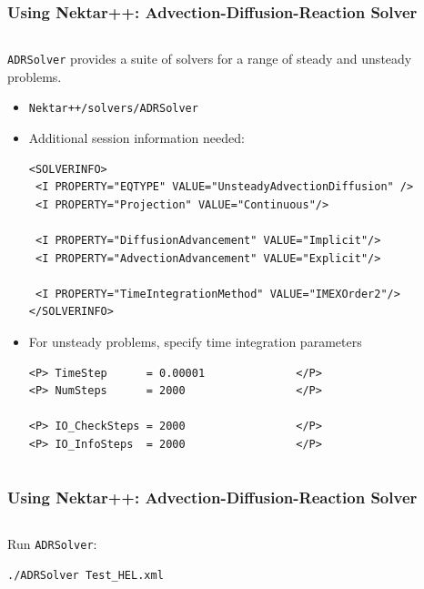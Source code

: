 \documentclass{beamer}
\numberwithin{figure}{section}
\numberwithin{equation}{section}
\begin{document}

\begin{frame}[fragile]
\frametitle{Using Nektar++: Advection-Diffusion-Reaction Solver}
\begin{minipage}[c][0.8\textheight][t]{\linewidth}
\begin{columns}
\begin{column}[l]{11.5cm}
\texttt{ADRSolver} provides a suite of solvers for a range of steady and
unsteady problems.
\begin{itemize}
  \item \texttt{Nektar++/solvers/ADRSolver}
  \item Additional session information needed:
  \begin{lstlisting}
<SOLVERINFO>
 <I PROPERTY="EQTYPE" VALUE="UnsteadyAdvectionDiffusion" />
 <I PROPERTY="Projection" VALUE="Continuous"/>
 
 <I PROPERTY="DiffusionAdvancement" VALUE="Implicit"/>
 <I PROPERTY="AdvectionAdvancement" VALUE="Explicit"/>
 
 <I PROPERTY="TimeIntegrationMethod" VALUE="IMEXOrder2"/>
</SOLVERINFO>
  \end{lstlisting}
  \item For unsteady problems, specify time integration parameters
  \begin{lstlisting}
<P> TimeStep      = 0.00001              </P>
<P> NumSteps      = 2000                 </P>

<P> IO_CheckSteps = 2000                 </P>
<P> IO_InfoSteps  = 2000                 </P>
  \end{lstlisting}
\end{itemize}
\end{column}
\end{columns}
\end{minipage}
\end{frame}


\begin{frame}[fragile]
\frametitle{Using Nektar++: Advection-Diffusion-Reaction Solver}
\begin{minipage}[c][0.8\textheight][t]{\linewidth}
\begin{columns}
\begin{column}[l]{11.5cm}
Run \texttt{ADRSolver}:
\begin{verbatim}
./ADRSolver Test_HEL.xml
\end{verbatim}
\end{column}
\end{columns}
\end{minipage}
\end{frame}
\end{document}
